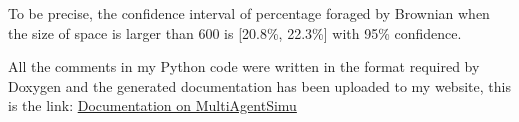 \documentclass[a4paper, 12pt]{report}
\begin{document}
To be precise, the confidence interval of percentage foraged by Brownian when the size of space is larger than 600 is [20.8\%, 22.3\%] with 95\% confidence.

All the comments in my Python code were written in the format required by Doxygen and the generated documentation has been uploaded to my website, this is the link: \href{http://chaihahaha.55555.io/MultiAgentSimu/class_multi_agent_simu.html}{Documentation on MultiAgentSimu}
{}
    
\end{document}
